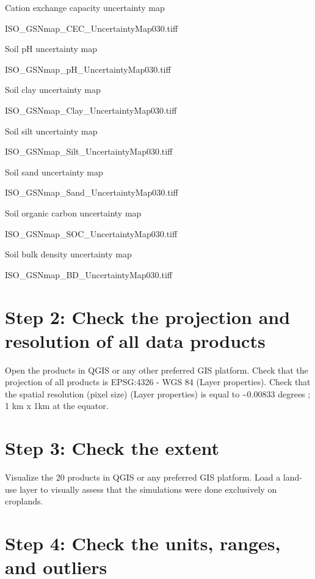 \documentclass[
  10pt,
  b5paper,
  oneside]{book}
\begin{document}
Cation exchange capacity uncertainty map

ISO\_GSNmap\_CEC\_UncertaintyMap030.tiff

Soil pH uncertainty map

ISO\_GSNmap\_pH\_UncertaintyMap030.tiff

Soil clay uncertainty map

ISO\_GSNmap\_Clay\_UncertaintyMap030.tiff

Soil silt uncertainty map

ISO\_GSNmap\_Silt\_UncertaintyMap030.tiff

Soil sand uncertainty map

ISO\_GSNmap\_Sand\_UncertaintyMap030.tiff

Soil organic carbon uncertainty map

ISO\_GSNmap\_SOC\_UncertaintyMap030.tiff

Soil bulk density uncertainty map

ISO\_GSNmap\_BD\_UncertaintyMap030.tiff

\hypertarget{step-2-check-the-projection-and-resolution-of-all-data-products}{%
\section*{Step 2: Check the projection and resolution of all data products}\label{step-2-check-the-projection-and-resolution-of-all-data-products}}

Open the products in QGIS or any other preferred GIS platform. Check that the projection of all products is EPSG:4326 - WGS 84 (Layer properties). Check that the spatial resolution (pixel size) (Layer properties) is equal to \textasciitilde0.00833 degrees ; 1 km x 1km at the equator.

\hypertarget{step-3-check-the-extent}{%
\section*{Step 3: Check the extent}\label{step-3-check-the-extent}}

Visualize the 20 products in QGIS or any preferred GIS platform. Load a land-use layer to visually assess that the simulations were done exclusively on croplands.

\hypertarget{step-4-check-the-units-ranges-and-outliers}{%
\section*{Step 4: Check the units, ranges, and outliers}\label{step-4-check-the-units-ranges-and-outliers}}
\end{document}
